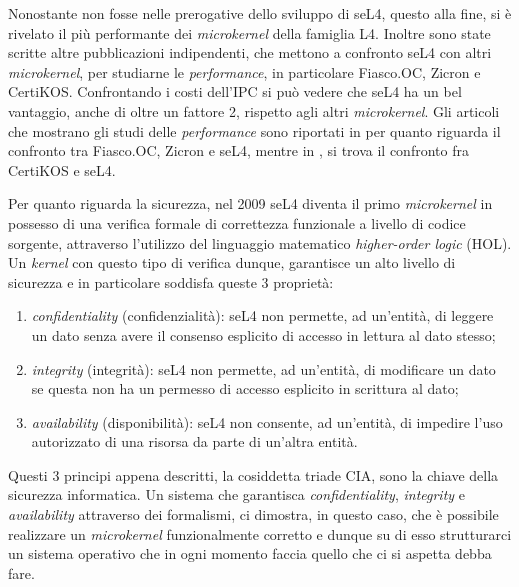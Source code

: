Nonostante non fosse nelle prerogative dello sviluppo di seL4, questo alla fine, si è rivelato il più performante dei \textit{microkernel} della famiglia L4. Inoltre sono state scritte altre pubblicazioni indipendenti, che mettono a confronto seL4 con altri \textit{microkernel}, per studiarne le \textit{performance}, in particolare Fiasco.OC, Zicron e CertiKOS. Confrontando i costi dell'IPC si può vedere che seL4 ha un bel vantaggio, anche di oltre un fattore 2, rispetto agli altri \textit{microkernel}.
Gli articoli che mostrano gli studi delle \textit{performance} sono riportati in \cite{skybridge} per quanto riguarda il confronto tra Fiasco.OC, Zicron e seL4, mentre in \cite{CertiKOS}, si trova il confronto fra CertiKOS e seL4.

Per quanto riguarda la sicurezza, nel 2009 seL4 diventa il primo \textit{microkernel} in possesso di una verifica formale di correttezza funzionale a livello di codice sorgente, attraverso l'utilizzo del linguaggio matematico \textit{higher-order logic} (HOL). Un \textit{kernel} con questo tipo di verifica dunque, garantisce un alto livello di sicurezza e in particolare soddisfa queste 3 proprietà:
\begin{enumerate}
	\item \textit{confidentiality} (confidenzialità): seL4 non permette, ad un'entità, di leggere un dato senza avere il consenso esplicito di accesso in lettura al dato stesso;
	\item \textit{integrity} (integrità): seL4 non permette, ad un'entità, di modificare un dato se questa non ha un permesso di accesso esplicito in scrittura al dato;
	\item \textit{availability} (disponibilità): seL4 non consente, ad un'entità, di impedire l'uso autorizzato di una risorsa da parte di un'altra entità.
\end{enumerate}

Questi 3 principi appena descritti, la cosiddetta triade CIA, sono la chiave della sicurezza informatica. Un sistema che garantisca \textit{confidentiality}, \textit{integrity} e \textit{availability} attraverso dei formalismi, ci dimostra, in questo caso, che è possibile realizzare un \textit{microkernel} funzionalmente corretto e dunque su di esso strutturarci un sistema operativo che in ogni momento faccia quello che ci si aspetta debba fare.